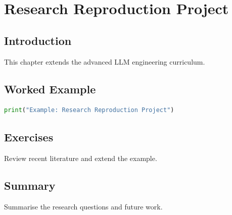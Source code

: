 \chapter{Research Reproduction Project}
\label{chap:vol13-9}



\section{Introduction}
This chapter extends the advanced LLM engineering curriculum.

\section{Worked Example}
\begin{lstlisting}[language=Python]
print("Example: Research Reproduction Project")
\end{lstlisting}

\section{Exercises}
\begin{exercise}
Review recent literature and extend the example.
\end{exercise}

\section{Summary}
Summarise the research questions and future work.
